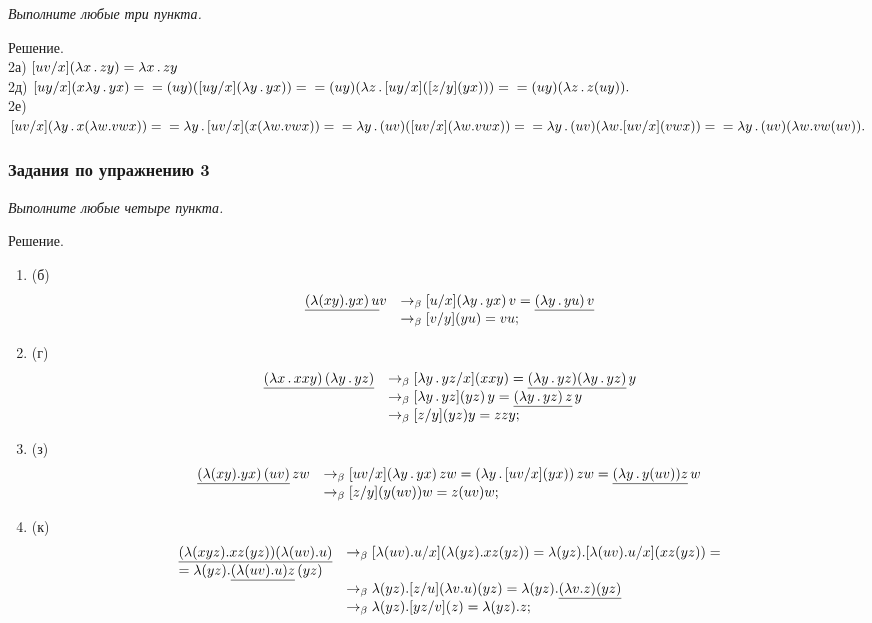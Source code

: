 \documentclass[12pt,a4paper]{article}
\begin{document}
\emph{Выполните любые три пункта.}

Решение.\\
2а) $[uv/x](\lambda x\,.\, zy) = \lambda x\,.\, zy$\\
2д) $[uy/x](x\lambda y\,.\, yx) = \\= (uy)([uy/x](\lambda y\,.\, yx)) = \\= (uy)(\lambda z\,.\, [uy/x]([z/y](yx))) = \\= (uy)(\lambda z\,.\, z(uy)).$\\
2е) $[uv/x](\lambda y\,.\, x( \lambda w.vwx)) = \\= \lambda y\,.\, [uv/x](x(\lambda w.vwx)) = \\= \lambda y\,.\, (uv)([uv/x](\lambda w.vwx)) = \\= \lambda y\,.\, (uv)(\lambda w.[uv/x](vwx)) = \\= \lambda y\,.\, (uv)(\lambda w.vw(uv)).$



\subsubsection*{Задания по упражнению 3}

\emph{Выполните любые четыре пункта.}

Решение.
\begin{enumerate}
\item
(б)
\[
\begin{array}{ll}
\underline{(\lambda(xy).yx)\,u}v &\rightarrow_\beta [u/x](\lambda y\,.\, yx)\,v = \underline{(\lambda y\,.\, yu)\,v}\\
&\rightarrow_\beta [v/y](yu) = vu;\\
\end{array}
\]
\item
(г)
\[
\begin{array}{ll}
\underline{(\lambda x\,.\, xxy)\,(\lambda y\,.\, yz)} &\rightarrow_\beta [\lambda y\,.\, yz/x](xxy) = \underline{(\lambda y\,.\, yz)(\lambda y\,.\, yz)}\,y\\
&\rightarrow_\beta [\lambda y\,.\, yz](yz)\,y = \underline{(\lambda y\,.\, yz)\,z}\,y\\ &\rightarrow_\beta [z/y](yz)y = zzy;\\
\end{array}
\]
\item
(з)
\[
\begin{array}{ll}
\underline{(\lambda(xy).yx)\,(uv)}\,zw &\rightarrow_\beta [uv/x](\lambda y\,.\, yx)\,zw = (\lambda y\,.\, [uv/x](yx) )\,zw = \underline{(\lambda y\,.\, y(uv))z}\,w \\ &\rightarrow_\beta [z/y](y(uv))w = z(uv)w;\\
\end{array}
\]
\item
(к)
\[
\begin{array}{ll}
\underline{(\lambda(xyz).xz(yz))(\lambda(uv).u)} &\rightarrow_\beta [\lambda(uv).u/x](\lambda(yz).xz(yz)) = \lambda(yz).[\lambda(uv).u/x](xz(yz)) = \\ = \lambda(yz).\underline{(\lambda(uv).u)z}\,(yz) \\ &\rightarrow_\beta \lambda(yz).[z/u](\lambda v.u)(yz) = \lambda(yz).\underline{(\lambda v.z)(yz)} \\ &\rightarrow_\beta \lambda(yz).[yz/v](z) = \lambda(yz).z;\\
\end{array}
\]
\end{enumerate}
\end{document}
